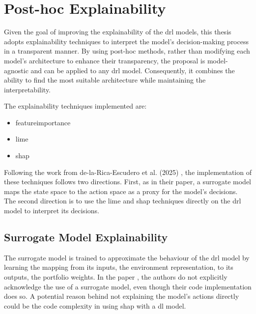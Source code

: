 \section{Post-hoc Explainability} \label{sec:post_hoc_explainability}

Given the goal of improving the explainability of the \acrshort{drl} models, this thesis adopts explainability techniques to interpret the model's decision-making process in a transparent manner. By using post-hoc methods, rather than modifying each model's architecture to enhance their transparency, the proposal is model-agnostic and can be applied to any \acrshort{drl} model. Consequently, it combines the ability to find the most suitable architecture while maintaining the interpretability.

The explainability techniques implemented are: 
\begin{itemize}
    \item \Gls{featureimportance}
    \item \acrfull{lime}
    \item \acrfull{shap}
\end{itemize}

Following the work from de-la-Rica-Escudero et al. (2025) \cite{de-La-Rica-Escudero2025}, the implementation of these techniques follows two directions. First, as in their paper, a surrogate model maps the state space to the action space as a proxy for the model's decisions. The second direction is to use the \acrshort{lime} and \acrshort{shap} techniques directly on the \acrshort{drl} model to interpret its decisions.

\subsection{Surrogate Model Explainability} \label{subsec:surrogate_model_explainability}

The surrogate model is trained to approximate the behaviour of the \acrshort{drl} model by learning the mapping from its inputs, the environment representation, to its outputs, the portfolio weights. In the paper \cite{de-La-Rica-Escudero2025}, the authors do not explicitly acknowledge the use of a surrogate model, even though their code implementation does so. A potential reason behind not explaining the model's actions directly could be the code complexity in using \acrshort{shap} with a \acrshort{dl} model. 

